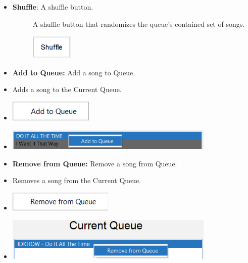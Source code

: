 \documentclass{article}
\begin{document}
\begin{itemize}
    \item \textbf{Shuffle}: A shuffle button.
    \begin{description}
        \item[] A shuffle button that randomizes the queue's contained set of songs.
        \item[] \includegraphics[width=2cm]{Images/Shuffle.png}
    \end{description}

    \item \textbf{Add to Queue:} Add a song to Queue.
        \item[] Adds a song to the Current Queue.
        \item[] \includegraphics[width=4cm]{Images/popup_rightClick_AddtoQueue.png}
        \item[] \includegraphics[width=10cm]{Images/popup_rightClick_AddtoQueueSelected.png}

    \item \textbf{Remove from Queue:} Remove a song from Queue.
        \item[] Removes a song from the Current Queue.
        \item[] \includegraphics[width=5cm]{Images/popup_rightClick_RemoveFromQueue.png}
        \item[] \includegraphics[width=10cm]{Images/popup_rightClick_RemoveFromQueueSelected.png}
\end{itemize}

\vspace{1cm}
\end{document}
